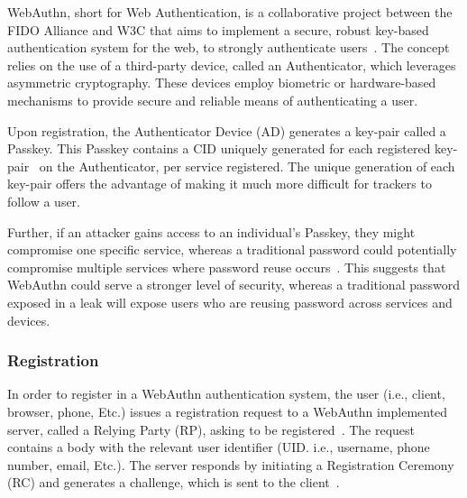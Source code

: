 
\newcommand{\credIdentifier}{\footnote{
  There is a requirement to check whether the credential identifier, generated
  by the Authenticator device exsits on the server.
  For further discussions on this topic, see section \hyperref[sec:futurework]{Future work}}}

\newcommand{\navigatorApi}{\footnote{In LessPM's case, this is the \textit{navigator.credentials} API provided by the browser.}}


WebAuthn, short for Web Authentication, is a collaborative project between the
FIDO Alliance and W3C that aims to implement a secure, robust key-based
authentication system for the web, to strongly authenticate users~\cite{webauthn_level_2}.
The concept relies on the use of a third-party device, called an Authenticator,
which leverages asymmetric cryptography.
These devices employ biometric or hardware-based mechanisms to provide secure
and reliable means of authenticating a user.

Upon registration, the Authenticator Device (AD) generates a key-pair called a
Passkey.
This Passkey contains a CID uniquely generated for each registered
key-pair~\cite{webauthn_credential_id,webauthn_public_key_credential} on the
Authenticator, per service registered.
The unique generation of each key-pair offers the advantage of making it much
more difficult for trackers to follow a user.

Further, if an attacker gains access to an individual's Passkey, they might
compromise one specific service, whereas a traditional password could
potentially compromise multiple services where password reuse
occurs~\cite{wang2018next}.
This suggests that WebAuthn could serve a stronger level of security, whereas
a traditional password exposed in a leak will expose users who are reusing
password across services and devices.

\subsubsection{Registration}\label{subsubsec:registration}
In order to register in a WebAuthn authentication system, the user (i.e.,
client, browser, phone, Etc.) issues a registration request to a
WebAuthn implemented server, called a Relying Party (RP), asking to be
registered~\cite{webauthn-2-rp}.
The request contains a body with the relevant user identifier (UID. i.e.,
username, phone number, email, Etc.).
The server responds by initiating a Registration Ceremony (RC) and generates a
challenge, which is sent to the client~\cite{webauthn-2}.

